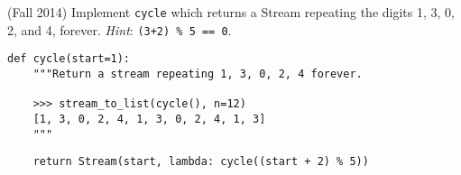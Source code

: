 \begin{blocksection}
\question (Fall 2014) Implement \texttt{cycle} which returns a Stream repeating
the digits 1, 3, 0, 2, and 4, forever. \emph{Hint}: \lstinline$(3+2) % 5 == 0$.

\begin{lstlisting}
def cycle(start=1):
    """Return a stream repeating 1, 3, 0, 2, 4 forever.

    >>> stream_to_list(cycle(), n=12)
    [1, 3, 0, 2, 4, 1, 3, 0, 2, 4, 1, 3]
    """
\end{lstlisting}

\begin{solution}[1in]
\begin{lstlisting}
    return Stream(start, lambda: cycle((start + 2) % 5))
\end{lstlisting}
\end{solution}
\end{blocksection}
